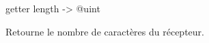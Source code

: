 \begin{galgascode}
getter length -> @uint
\end{galgascode}

Retourne le nombre de caractères du récepteur.






%
%
%
%
%
%
%
%
%
%
%
%
%
%
%
%
%
%
%
%
%
%
%
%
%
%
%
%
%
%
%
%
%
%
%
%
%
%
